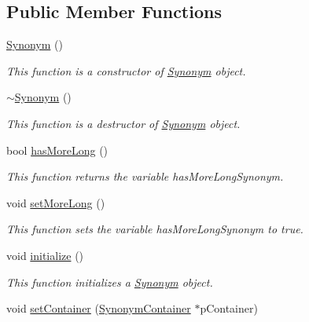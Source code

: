 \subsection*{Public Member Functions}
\begin{CompactItemize}
\item 
\hyperlink{classkmaOrange_1_1Synonym_15f7de0140cea25ad188b3bc8e1dd093}{Synonym} ()
\begin{CompactList}\small\item\em This function is a constructor of \hyperlink{classkmaOrange_1_1Synonym}{Synonym} object. \item\end{CompactList}\item 
\hyperlink{classkmaOrange_1_1Synonym_78c4aa5c70db24979a66dd607da2dd42}{$\sim$Synonym} ()
\begin{CompactList}\small\item\em This function is a destructor of \hyperlink{classkmaOrange_1_1Synonym}{Synonym} object. \item\end{CompactList}\item 
bool \hyperlink{classkmaOrange_1_1Synonym_af600c78524ff2f1bfef1b10219f91e0}{hasMoreLong} ()
\begin{CompactList}\small\item\em This function returns the variable hasMoreLongSynonym. \item\end{CompactList}\item 
void \hyperlink{classkmaOrange_1_1Synonym_ddb51b0a9b2074e9ff7d2bb3640ee1eb}{setMoreLong} ()
\begin{CompactList}\small\item\em This function sets the variable hasMoreLongSynonym to true. \item\end{CompactList}\item 
void \hyperlink{classkmaOrange_1_1Synonym_7628a45375a8b5ac25f5f572a0e0b368}{initialize} ()
\begin{CompactList}\small\item\em This function initializes a \hyperlink{classkmaOrange_1_1Synonym}{Synonym} object. \item\end{CompactList}\item 
void \hyperlink{classkmaOrange_1_1Synonym_e39f24c0c406a842b06f878268246fc1}{setContainer} (\hyperlink{classkmaOrange_1_1SynonymContainer}{SynonymContainer} $\ast$pContainer)

\end{CompactItemize}
